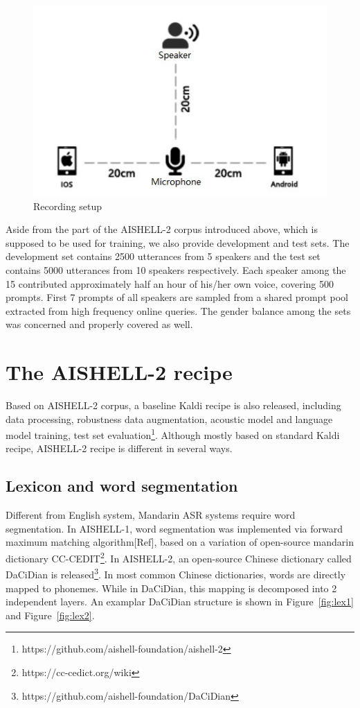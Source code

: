 \documentclass[a4paper]{article}
\begin{document}
\begin{figure}[t]
  \centering
  \includegraphics[width=\linewidth]{setup.jpg}
  \caption{Recording setup}
  \label{fig:setup}
\end{figure}

\noindent Aside from the part of the AISHELL-2 corpus introduced above, which is supposed to be used for training, we also provide development and test sets. The development set contains 2500 utterances from 5 speakers and the test set contains 5000 utterances from 10 speakers respectively. Each speaker among the 15 contributed approximately half an hour of his/her own voice, covering 500 prompts. First 7 prompts of all speakers are sampled from a shared prompt pool extracted from high frequency online queries. The gender balance among the sets was concerned and properly covered as well.

\section{The AISHELL-2 recipe}

Based on AISHELL-2 corpus, a baseline Kaldi recipe is also released, including
data processing, robustness data augmentation, acoustic model and language model
training, test set
evaluation\footnote{https://github.com/aishell-foundation/aishell-2}. Although
mostly based on standard Kaldi recipe, AISHELL-2 recipe is different in several
ways.

\subsection{Lexicon and word segmentation}

Different from English system, Mandarin ASR systems require word
segmentation. In AISHELL-1, word segmentation was implemented via forward
maximum matching algorithm[Ref], based on a variation of open-source mandarin
dictionary CC-CEDIT\footnote{https://cc-cedict.org/wiki}. In AISHELL-2, an
open-source Chinese dictionary called DaCiDian is
released\footnote{https://github.com/aishell-foundation/DaCiDian}. In most
common Chinese dictionaries, words are directly mapped to phonemes. While in
DaCiDian, this mapping is decomposed into 2 independent layers. An examplar
DaCiDian structure is shown in Figure~\ref{fig:lex1} and Figure~\ref{fig:lex2}.
\end{document}
